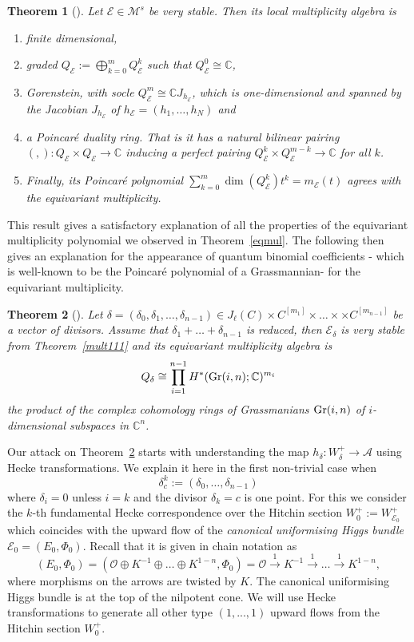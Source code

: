 \documentclass[12pt]{article}
\numberwithin{equation}{section}
\newtheorem{theorem}{Theorem}
\theoremstyle{remark}
\numberwithin{theorem}{section}
\def\calE{{\mathcal E}}
\def\C{\mathbb{C}}
\def\M{{\mathcal{M}}}
\def\calA{{\mathcal{A}}}
\def\calO{{\mathcal O}}
\newcommand{\Gr}{\textnormal{Gr}}
\numberwithin{equation}{section}
\begin{document}
\begin{theorem}[\cite{hausel-hitchin1}] Let $\calE\in \M^s$ be very stable. Then its local multiplicity algebra is \begin{enumerate} \item finite dimensional,\item  graded $Q_\calE:=\bigoplus_{k=0}^m Q_\calE^k$ such that $Q_\calE^0\cong \C$, \item   Gorenstein, with socle $Q^m_\calE\cong \C J_{h_\calE}$, which is one-dimensional and spanned by the Jacobian $J_{h_\calE}$ of $h_\calE=(h_1,\dots,h_N)$ and  \item  a Poincar\'e duality ring. That is it has a natural bilinear pairing $(,):Q_\calE\times Q_\calE \to \C$ inducing a perfect pairing  $Q_\calE^k\times Q_\calE^{m-k}\to \C$ for all $k$. \item Finally, its Poincar\'e polynomial $\sum_{k=0}^m \dim(Q^k_\calE) t^k=m_\calE(t)$ agrees with the equivariant multiplicity. \end{enumerate}
\end{theorem}

This result gives a satisfactory explanation of all the properties of the equivariant multiplicity polynomial we observed in Theorem~\ref{eqmul}. The following then gives an explanation for the appearance of quantum binomial coefficients - which is well-known to be the Poincar\'e polynomial of a Grassmannian-  for the equivariant multiplicity. 

\begin{theorem}[\cite{hausel-hitchin1}] \label{mainema} Let $\delta=(\delta_0,\delta_1,\dots,\delta_{n-1})\in J_\ell(C)\times C^{[m_1]}\times \dots \times \times C^{[m_{n-1}]}$ be a vector of divisors. Assume that $\delta_1+\dots+\delta_{n-1}$ is reduced, then $\calE_\delta$ is very stable from Theorem~\ref{mult111} and its equivariant multiplicity algebra is $$Q_{\delta}\cong \prod_{i=1}^{n-1} H^*(\Gr(i,n);\C)^{m_i}$$ the product of the complex cohomology rings of Grassmanians $\Gr(i,n)$ of $i$-dimensional subspaces in $\C^n$.  
\end{theorem}

Our attack on Theorem~\ref{mainema} starts with understanding the map $h_{\delta}:W^+_{\delta}\to \calA$ using Hecke transformations. We explain it here in the first non-trivial case when $$\delta^k_c:=(\delta_0,\dots,\delta_{n-1})$$ where  $\delta_i=0$ unless $i=k$ and the divisor $\delta_k=c$ is one point.  For this we consider the $k$-th fundamental  Hecke correspondence over the Hitchin section $W^+_0:=W^+_{\calE_0}$ which coincides with the upward flow of the {\em canonical uniformising Higgs bundle} $\calE_0=(E_0,\Phi_0)$. Recall \cite[(3.16)]{hausel-hitchin} that it is given in chain notation as $$(E_0,\Phi_0)=(\calO\oplus K^{-1}\oplus \dots\oplus K^{1-n},\Phi_0)= \calO\stackrel{1}{\rightarrow} K^{-1} \stackrel{1}{\rightarrow} \dots \stackrel{1}{\rightarrow}  K^{1-n},$$ where morphisms on the arrows are twisted by $K$. The canonical uniformising Higgs bundle is at the top of the nilpotent cone. We will use Hecke transformations to generate all other type $(1,...,1)$ upward flows from the Hitchin section $W^+_0$.
\end{document}
